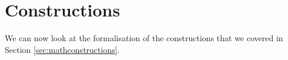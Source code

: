 \section{Constructions}

We can now look at the formalisation of the constructions that we covered in Section \ref{sec:mathconstructions}.





